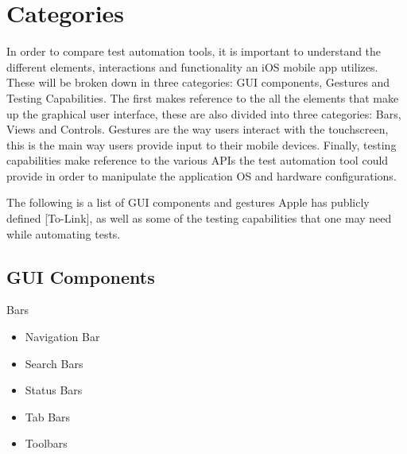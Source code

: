 \section{Categories}
In order to compare test automation tools, it is important to understand the different elements, interactions and functionality an iOS mobile app utilizes. These will be broken down in three categories: GUI components, Gestures and Testing Capabilities. The first makes reference to the all the elements that make up the graphical user interface, these are also divided into three categories: Bars, Views and Controls. Gestures are the way users interact with the touchscreen, this is the main way users provide input to their mobile devices. Finally, testing capabilities make reference to the various APIs the test automation tool could provide in order to manipulate the application OS and hardware configurations.

The following is a list of GUI components and gestures Apple has publicly defined [To-Link], as well as some of the testing capabilities that one may need while automating tests. 

\subsection {GUI Components}
	
	Bars
	\begin{itemize}
  		\vspace{-0.4cm}\item Navigation Bar
  		\vspace{-0.4cm}\item Search Bars
		\vspace{-0.4cm}\item Status Bars
		\vspace{-0.4cm}\item Tab Bars
		\vspace{-0.4cm}\item Toolbars
	\end{itemize}

